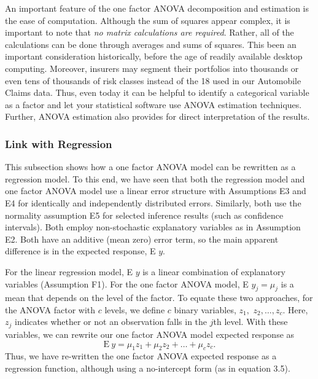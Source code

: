 \linejed



An important feature of the one factor ANOVA decomposition and
estimation is the ease of computation. Although the sum of squares
appear complex, it is important to note that \emph{no matrix
calculations are required}. Rather, all of the calculations can be
done through averages and sums of squares. This been an important
consideration historically, before the age of readily available
desktop computing. Moreover, insurers may segment their portfolios into thousands
or even tens of thousands of risk classes instead of the 18 used in our Automobile
Claims data. Thus, even today it can be helpful to identify a categorical variable as
a factor and let your statistical software use ANOVA estimation techniques. Further, ANOVA estimation
also provides for direct interpretation of the results.


\subsubsection*{Link with Regression}

This subsection shows how a one factor ANOVA model can be rewritten
as a regression model. To this end, we have seen that both the
regression model and one factor ANOVA model use a linear error
structure with Assumptions E3 and E4 for identically and
independently distributed errors. Similarly, both use the normality
assumption E5 for selected inference results (such as confidence
intervals). Both employ non-stochastic explanatory variables as in
Assumption E2. Both have an additive (mean zero) error term, so the
main apparent difference is in the expected response, E $y$.

For the linear regression model, E $y$ is a linear combination of
explanatory variables (Assumption F1). For the one factor ANOVA model, E $y_j =
\mu_j$ is a mean that depends on the level of the factor. To equate
these two approaches, for the ANOVA factor with $c$ levels, we
define $c$ binary variables, $z_1,$ $z_2,\ldots ,z_c$. Here, $z_j$
indicates whether or not an observation falls in the $j$th level.
With these variables, we can rewrite our one factor ANOVA model
expected response as
\begin{equation}\label{E4:OneFactor}
\textrm{E}~y = \mu_1 z_1 + \mu_2 z_2 + \ldots + \mu_c z_c.
\end{equation}
Thus, we have re-written the one factor ANOVA expected response as a
regression function, although using a no-intercept form (as in
equation 3.5).

